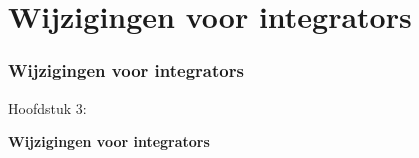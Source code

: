 %

\section{Wijzigingen voor integrators}
\begin{frame}[fragile]
	\frametitle{Wijzigingen voor integrators}

	\begin{center}\huge{Hoofdstuk 3:}\end{center}
	\begin{center}\huge{\color{typo3darkgrey}\textbf{Wijzigingen voor integrators}}\end{center}

\end{frame}

